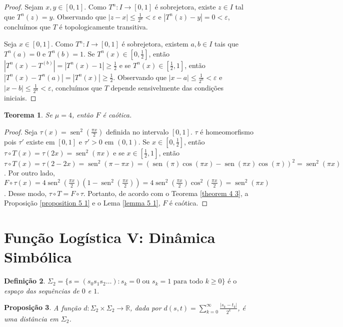 \documentclass[a4paper, 12pt]{article}
\theoremstyle{definition}
\newtheorem{definition}{Definição}[section]
\theoremstyle{plain}
\newtheorem{proposition}[definition]{Proposição}
\theoremstyle{plain}
\theoremstyle{plain}
\newtheorem{theorem}[definition]{Teorema}
\theoremstyle{definition}
\theoremstyle{remark}
\newcommand{\RR}{\mathbb{R}}
\DeclareMathOperator{\sen}{sen}
\begin{document}
\begin{proof}
Sejam $x, y \in [0,1]$. Como $T^n: I \to [0,1]$ é sobrejetora, existe $z \in I$ tal que $T^n(z) = y$. Observando que $|z - x| \leq \frac{1}{2^n} < \varepsilon$ e $|T^n(z) - y| = 0 < \varepsilon$, concluímos que $T$ é topologicamente transitiva.

Seja $x \in [0,1]$.  Como $T^n: I \to [0,1]$ é sobrejetora, existem $a, b \in I$ tais que $T^n(a) = 0$ e $T^n(b) = 1$. Se $T^n(x) \in [0, \frac{1}{2}]$, então $|T^n(x) - T^(b)| = |T^n(x) - 1| \geq \frac{1}{2}$ e se $T^n(x) \in [\frac{1}{2}, 1]$, então $|T^n(x) - T^n(a)| = |T^n(x)| \geq \frac{1}{2}$. Observando que $|x - a| \leq \frac{1}{2^n} < \varepsilon$ e $|x - b| \leq \frac{1}{2^n} < \varepsilon$, concluímos que $T$ depende sensivelmente das condições iniciais.
\end{proof}

\begin{theorem}
Se $\mu = 4$, então $F$ é caótica.
\end{theorem}

\begin{proof}
Seja $\tau(x) = \sen^2(\frac{\pi x}{2})$ definida no intervalo $ [0,1]$. $\tau$ é homeomorfismo pois $\tau'$ existe em $[0,1]$ e $\tau' > 0$ em $(0,1)$. Se $x \in [0, \frac{1}{2}]$, então $\tau \circ T(x) = \tau(2x) = \sen^2(\pi x)$ e se $x \in [\frac{1}{2}, 1]$, então $\tau \circ T(x) = \tau(2 - 2x) = \sen^2(\pi- \pi x) = (\sen(\pi)\cos(\pi x) - \sen(\pi x)\cos(\pi))^2 = \sen^2(\pi x)$. Por outro lado, $F \circ \tau(x) = 4\sen^2(\frac{\pi x}{2})(1 - \sen^2(\frac{\pi x}{2})) = 4\sen^2(\frac{\pi x}{2})\cos^2(\frac{\pi x}{2}) = \sen^2(\pi x)$. Desse modo, $\tau \circ T = F \circ \tau$. Portanto, de acordo com o Teorema \ref{theorem 4 3}, a Proposição \ref{proposition 5 1} e o Lema \ref{lemma 5 1}, $F$ é caótica.
\end{proof}

\section{Função Logística V: Dinâmica Simbólica}

\begin{definition}
$\Sigma_2 = \{s = (s_0s_1s_2\dots) : s_k = 0 \textrm{ ou } s_k = 1 \textrm{ para todo } k\geq 0\}$ é o \textit{espaço das sequências de $0$ e $1$}.
\end{definition}

\begin{proposition}
A função $d: \Sigma_2 \times \Sigma_2 \to \RR$, dada por $d(s, t) = \sum_{k=0}^{\infty} \frac{|s_k - t_k|}{2^k}$, é uma distância em $\Sigma_2$.
\end{proposition}
\end{document}

